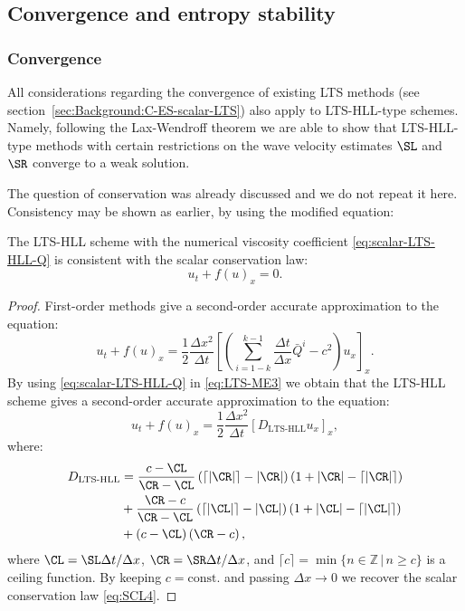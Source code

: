\subsection{Convergence and entropy stability}
\label{sec:LTS-HLL:C-ES-scalar-LTS}

\subsubsection*{Convergence} 

All considerations regarding the convergence of existing LTS methods (see section~\ref{sec:Background:C-ES-scalar-LTS}) also apply to LTS-HLL-type schemes. Namely, following the Lax-Wendroff theorem we are able to show that LTS-HLL-type methods with certain restrictions on the wave velocity estimates $ \SL $ and $ \SR $ converge to a weak solution.

The question of conservation was already discussed and we do not repeat it here. Consistency may be shown as earlier, by using the modified equation:
\begin{lemma} \label{lemma:LTS-HLL-consistent}
The LTS-HLL scheme with the numerical viscosity coefficient \eqref{eq:scalar-LTS-HLL-Q} is consistent with the scalar conservation law:
\begin{equation} \label{eq:SCL4}
u_t + f(u)_x = 0.
\end{equation}
\end{lemma}

\begin{proof}
First-order methods give a second-order accurate approximation to the equation:
\begin{equation} \label{eq:LTS-ME3}
u_t + f(u)_x = \frac{1}{2} \frac{\Delta x^2}{\Delta t} \left[ \left( \sum\limits_{i=1-k}^{k-1} \frac{\Delta t}{\Delta x} \bar{Q}^i - c^2 \right) u_x \right]_x.
\end{equation}
By using \eqref{eq:scalar-LTS-HLL-Q} in \eqref{eq:LTS-ME3} we obtain that the LTS-HLL scheme gives a second-order accurate approximation to the equation:
\begin{equation} \label{eq:LTS-ME-HLL}
u_t + f(u)_x = \frac{1}{2} \frac{\Delta x^2}{\Delta t} \left[ D_{\text{LTS-HLL}} u_x \right]_x,
\end{equation}
where:
\begin{align}
D_\text{LTS-HLL} & = \frac{c - \CL}{\CR - \CL} \left( \lceil |\CR| \rceil - |\CR| \right) \left( 1 + |\CR| - \lceil |\CR| \rceil \right) \notag \\ 
& + \frac{\CR - c}{\CR - \CL} \left( \lceil |\CL| \rceil - |\CL| \right) \left( 1 + |\CL| - \lceil |\CL| \rceil \right) \notag \\ 
& + \left( c - \CL \right) \left( \CR - c \right),
\end{align}
where $ \CL = \SL \Delta t / \Delta x $, $ \CR = \SR \Delta t / \Delta x $, and $ \lceil c \rceil = \min \{ n \in \mathbb{Z} \,| \, n \geq c \} $ is a ceiling function. By keeping $ c = \text{const.} $ and passing $ \Delta x \rightarrow 0 $ we recover the scalar conservation law \eqref{eq:SCL4}.
\end{proof}

